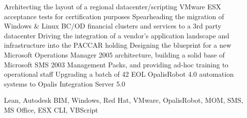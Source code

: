 \begin{experiences}
{\begin{itemize}
                        \linebreak Architecting the layout of a regional datacenter/scripting VMware ESX acceptance tests for certification purposes
                        \linebreak Spearheading the migration of Windows \& Linux BC/OD financial clusters and services to a 3rd party datacenter
                        \linebreak Driving the integration of a vendor's application landscape and infrastructure into the PACCAR holding
                        \linebreak Designing the blueprint for a new Microsoft Operations Manager 2005 architecture, building a solid base of Microsoft SMS 2003 Management Packs, and providing ad-hoc training to operational staff
                        \linebreak Upgrading a batch of 42 EOL OpalisRobot 4.0 automation systems to Opalis Integration Server 5.0
                      \end{itemize}
                    }
                    {Lean, Autodesk BIM, Windows, Red Hat, VMware, OpalisRobot, MOM, SMS, MS Office, ESX CLI, VBScript}
\end{experiences}
